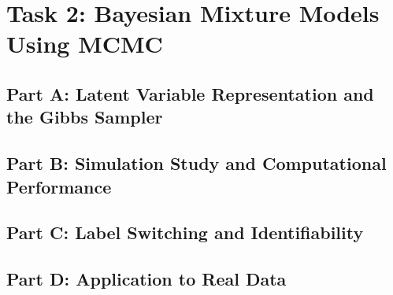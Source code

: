 \documentclass[
  english,
  11pt,
  a4paper,
]{article}
\begin{document}
\FloatBarrier

\section{Task 2: Bayesian Mixture Models Using
MCMC}\label{task-2-bayesian-mixture-models-using-mcmc}

\subsection{Part A: Latent Variable Representation and the Gibbs
Sampler}\label{part-a-latent-variable-representation-and-the-gibbs-sampler}

\subsection{Part B: Simulation Study and Computational
Performance}\label{part-b-simulation-study-and-computational-performance}

\subsection{Part C: Label Switching and
Identifiability}\label{part-c-label-switching-and-identifiability}

\subsection{Part D: Application to Real
Data}\label{part-d-application-to-real-data}
\end{document}
